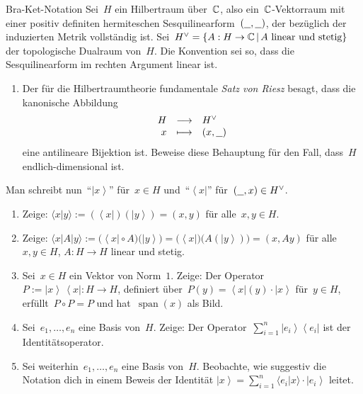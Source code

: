 \documentclass{pizzablatt}
\newcommand{\bra}[1]{\left\langle #1 \right|}
\newcommand{\ket}[1]{\left| #1 \right\rangle}
\begin{document}
\begin{aufgabe}{Bra-Ket-Notation}
Sei~$H$ ein Hilbertraum über~$\mathbb{C}$, also ein~$\mathbb{C}$-Vektorraum mit einer
positiv definiten hermiteschen Sesquilinearform~$(\underline{\ \ },\underline{\ \ })$, der
bezüglich der induzierten Metrik vollständig ist. Sei~$H^\vee =
\{ A : H \to \mathbb{C} \,|\, \text{$A$ linear und stetig} \}$ der topologische
Dualraum von~$H$. Die Konvention sei so, dass die Sesquilinearform im rechten
Argument linear ist.

\begin{enumerate}
\item Der für die Hilbertraumtheorie fundamentale \emph{Satz von Riesz} besagt,
dass die kanonische Abbildung
\[ \begin{array}{@{}rcl@{}}
  H &\longrightarrow& H^\vee \\
  x &\longmapsto& (x, \freist)
\end{array} \]
eine antilineare Bijektion ist. Beweise diese Behauptung für den Fall, dass~$H$
endlich-dimensional ist.
\end{enumerate}

Man schreibt nun~"`$\ket{x}$"' für~$x \in H$ und~"`$\bra{x}$"' für~$(\underline{\ \ },x)
\in H^\vee$.

\begin{enumerate}
\addtocounter{enumi}{1}
\item Zeige: $\langle x|y \rangle := (\bra{x})(\ket{y}) = (x,y)$ für
alle~$x,y \in H$.
\item Zeige: $\langle x|A|y \rangle := \bigl(\bra{x} \circ A\bigr)
\bigl(\ket{y}\bigr) = \bigl(\bra{x}\bigr) \bigl(A(\ket{y})\bigr) = (x,Ay)$ für
alle~$x,y \in H$, $A : H \to H$ linear und stetig.
\item Sei~$x \in H$ ein Vektor von Norm~$1$. Zeige: Der Operator~$P := \ket{x} \, \bra{x} : H \to H$, definiert
über~$P(y) = \bra{x}(y) \cdot \ket{x}$ für~$y \in H$, erfüllt~$P \circ P = P$
und hat~$\operatorname{span}(x)$ als Bild.
\item Sei~$e_1,\ldots,e_n$ eine Basis von~$H$. Zeige: Der
Operator~$\sum_{i=1}^n \ket{e_i} \bra{e_i}$ ist der Identitätsoperator.
\item Sei weiterhin~$e_1,\ldots,e_n$ eine Basis von~$H$. Beobachte, wie
suggestiv die Notation dich in einem Beweis der Identität $\ket{x} =
\sum_{i=1}^n \langle e_i|x \rangle \cdot \ket{e_i}$ leitet.
\end{enumerate}
\end{aufgabe}
\end{document}
